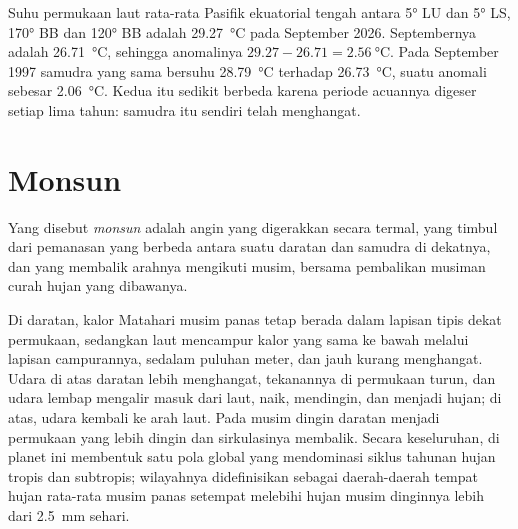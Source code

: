 \begin{example}\label{ex:b2:climate-variability:anomaly}
Suhu permukaan laut rata-rata Pasifik ekuatorial tengah antara \ang{5} LU dan
\ang{5} LS, \ang{170} BB dan \ang{120} BB adalah \qty{29.27}{\celsius} pada September 2026. 
Septembernya adalah \qty{26.71}{\celsius}, sehingga anomalinya $29.27 - 26.71 = \qty{2.56}{\celsius}$.
Pada September 1997 samudra yang sama bersuhu \qty{28.79}{\celsius} terhadap \qty{26.73}{\celsius}, suatu
anomali sebesar \qty{2.06}{\celsius}. Kedua  itu sedikit berbeda karena periode acuannya
digeser setiap lima tahun: samudra itu sendiri telah menghangat.
\end{example}

\section{Monsun}\label{sec:b2:climate-variability:monsoons}

\begin{definition}[Monsun]\label{def:b2:climate-variability:monsoon}
Yang disebut \emph{monsun} adalah angin yang digerakkan secara termal, yang timbul dari pemanasan yang berbeda antara
suatu daratan dan samudra di dekatnya, dan yang membalik arahnya mengikuti musim, bersama
pembalikan musiman curah hujan yang dibawanya.
\end{definition}

Di daratan, kalor Matahari musim panas tetap berada dalam lapisan tipis dekat permukaan, sedangkan laut mencampur
kalor yang sama ke bawah melalui lapisan campurannya, sedalam puluhan meter, dan jauh kurang menghangat. Udara di atas
daratan lebih menghangat, tekanannya di permukaan turun, dan udara lembap mengalir masuk dari laut, naik, mendingin, dan
menjadi hujan; di atas, udara kembali ke arah laut. Pada musim dingin daratan menjadi permukaan yang lebih dingin dan sirkulasinya
membalik. Secara keseluruhan,  di planet ini membentuk satu pola global yang mendominasi siklus
tahunan hujan tropis dan subtropis; wilayahnya didefinisikan sebagai daerah-daerah tempat hujan rata-rata
musim panas setempat melebihi hujan musim dinginnya lebih dari \qty{2.5}{mm} sehari.

